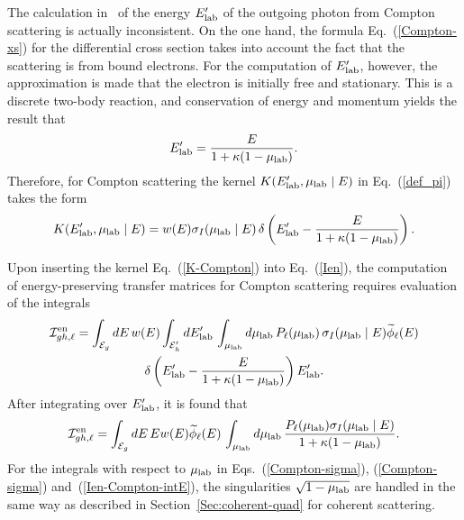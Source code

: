 The calculation in \gettransfer\ of the energy $E_{\text{lab}}'$ of the outgoing photon
from Compton scattering is actually inconsistent.  On the one hand, the formula
Eq.~(\ref{Compton-xs}) for the differential cross section takes
into account the fact that the scattering is from bound electrons.
For the computation of $E_{\text{lab}}'$, however,
the approximation is made that the electron is
initially free and stationary.
This is a discrete two-body reaction,
and conservation of energy and momentum yields the result that
\begin{equation}
  E_{\text{lab}}' = \frac{E}{1 + \kappa(1 - \mu_{\text{lab}})}.
  \label{Compton-Eout}
\end{equation}
Therefore, for Compton scattering the kernel $K(E_{\text{lab}}', \mu_{\text{lab}} \mid E)$ 
in Eq.~(\ref{def_pi}) takes the form
\begin{equation}
   K(E_{\text{lab}}', \mu_{\text{lab}} \mid E) = w(E) \sigma_I(\mu_{\text{lab}} \mid E) \,
     \delta\left(
         E_{\text{lab}}' - \frac{E}{1 + \kappa(1 - \mu_{\text{lab}})}
     \right).
  \label{K-Compton}
\end{equation}

Upon inserting the kernel Eq.~(\ref{K-Compton}) into Eq.~(\ref{Ien}),
the computation of energy-preserving transfer matrices
for Compton scattering requires evaluation of the integrals
\begin{multline}
    {\cal I}^{\text{en}}_{gh,\ell} =
     \int_{{\cal E}_g} dE \,  w(E)
     \int_{{\cal E}_h' } dE_{\text{lab}}' \, \int_{\mu_{\text{lab}}} d\mu_{\text{lab}}  \, 
     P_\ell ( \mu_{\text{lab}} ) \, \sigma_I(\mu_{\text{lab}} \mid E)
      \widetilde \phi_\ell(E) \\
      \delta \left(
         E_{\text{lab}}' - \frac{E}{1 + \kappa(1 - \mu_{\text{lab}})}
     \right)E_{\text{lab}}'.
  \label{Ien-Compton}
\end{multline}
After integrating over $E_{\text{lab}}'$, it is found that
\begin{equation}
    {\cal I}^{\text{en}}_{gh,\ell} =
     \int_{{\cal E}_g} dE \, E  w(E) \widetilde \phi_\ell(E) \,
     \int_{\mu_{\text{lab}}} d\mu_{\text{lab}}  \,  
         \frac{P_\ell ( \mu_{\text{lab}} ) \sigma_I(\mu_{\text{lab}} \mid E)}{1 + \kappa(1 - \mu_{\text{lab}})}.
  \label{Ien-Compton-intE}
\end{equation}
For the integrals 
with respect to $\mu_{\text{lab}}$ in Eqs.~(\ref{Compton-sigma}),
(\ref{Compton-sigma}) and~(\ref{Ien-Compton-intE}),
the singularities $\sqrt{1 - \mu_{\text{lab}}}$ are handled in the same way as
described in Section~\ref{Sec:coherent-quad} for coherent scattering.

\begin{figure}

\end{figure}


